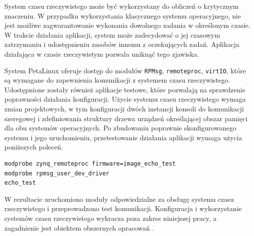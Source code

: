
System czasu rzeczywistego może być wykorzystany do obliczeń o krytycznym znaczeniu. 
W przypadku wykorzystania klasycznego systemu operacyjnego, nie jest możliwe zagwarantowanie wykonania dowolnego zadania w określonym czasie. 
W trakcie działania aplikacji, system może zadecydować o jej czasowym zatrzymaniu i udostępnieniu zasobów innemu z oczekujących zadań. 
Aplikacja działająca w czasie rzeczywistym pozwala uniknąć tego zjawiska.

System PetaLinux oferuje dostęp do modułów \texttt{RPMsg}, \texttt{remoteproc}, \texttt{virtIO}, które są wymagane do zapewnienia komunikacji z systemem czasu rzeczywistego. 
Udostępnione zostały również aplikacje testowe, które pozwalają na sprawdzenie poprawności działania konfiguracji.
Użycie systemu czasu rzeczywistego wymaga zmian projektowych, w tym konfiguracji dwóch instancji konsoli do komunikacji szeregowej i zdefiniowania struktury drzewa urządzeń określającej obszar pamięci dla obu systemów operacyjnych. 
Po zbudowaniu poprawnie skonfigurowanego systemu i jego uruchomieniu, przetestowanie działania aplikacji wymaga użycia poniższych poleceń.

\begin{lstlisting}[breaklines=true]
modprobe zynq_remoteproc firmware=image_echo_test
modprobe rpmsg_user_dev_driver
echo_test
\end{lstlisting}

W rezultacie uruchomiono moduły odpowiedzialne za obsługę systemu czasu rzeczywistego i przeprowadzono test komunikacji. %
Konfiguracja i wykorzystanie systemów czasu rzeczywistego wykracza poza zakres niniejszej pracy, a zagadnienie jest obiektem obszernych opracowań \cite{adam-taylor-openamp,zynq-openamp-gsg}.


